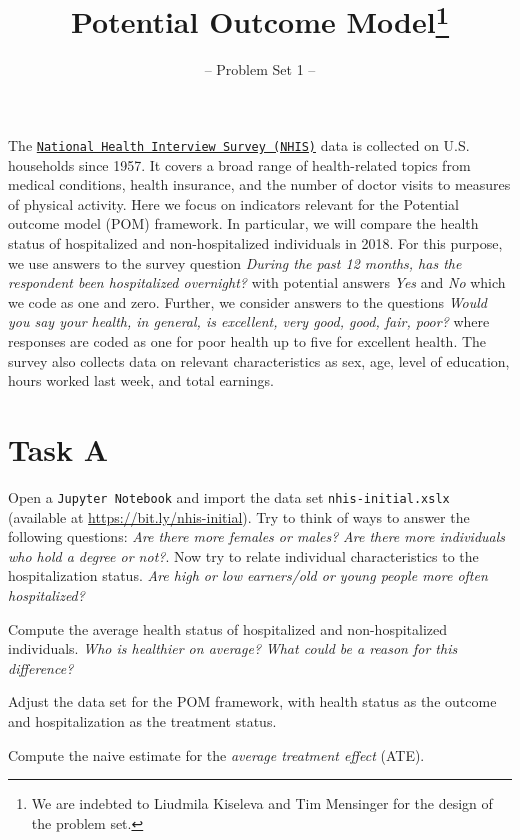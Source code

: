 

\title{Potential Outcome Model\thanks{We are indebted to Liudmila Kiseleva and Tim Mensinger for the design of the problem set.}}
\subtitle{-- Problem Set 1 --}
\date{}

\maketitle\vspace{-2cm}

The \href{https://www.cdc.gov/nchs/nhis/index.htm}{\texttt{National Health Interview Survey (NHIS)}} data is collected on U.S. households since 1957. It covers a broad range of health-related topics from medical conditions, health insurance, and the number of doctor visits to measures of physical activity. Here we focus on indicators relevant for the Potential outcome model (POM) framework. In particular, we will compare the health status of hospitalized and non-hospitalized individuals in 2018. For this purpose, we use answers to the survey question \textit{During the past 12 months, has the respondent been hospitalized overnight?} with potential answers \textit{Yes} and \textit{No} which we code as one and zero. Further, we consider answers to the questions \textit{Would you say your health, in general, is excellent, very good, good, fair, poor?} where responses are coded as one for poor health up to five for excellent health. The survey also collects data on relevant characteristics as sex, age, level of education, hours worked last week, and total earnings.

\section*{Task A}

\begin{boenumerate}

  \item Open a \texttt{Jupyter Notebook} and import the data set \texttt{nhis-initial.xslx} (available at \url{https://bit.ly/nhis-initial}). Try to think of ways to answer the following questions: \textit{Are there more females or males?} \textit{Are there more individuals who hold a degree or not?}. Now try to relate individual characteristics to the hospitalization status. \textit{Are high or low earners/old or young people more often hospitalized?}

  \item Compute the average health status of hospitalized and non-hospitalized individuals. \textit{Who is healthier on average?} \textit{What could be a reason for this difference?}

  \item Adjust the data set for the POM framework, with health status as the outcome and hospitalization as the treatment status.

  \item Compute the naive estimate for the \textit{average treatment effect} (ATE).

\end{boenumerate}


